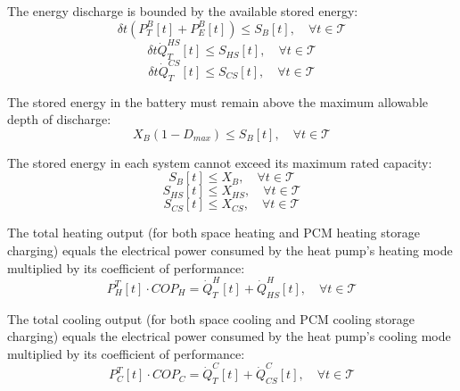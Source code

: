 \documentclass[11pt]{article}
\begin{document}
The energy discharge is bounded by the available stored energy:
\begin{equation}
\delta t (P^B_T[t] + P^B_E[t]) \leq S_B[t], \quad \forall t \in \mathcal{T}
\label{eq:batt_discharge}
\end{equation}
\begin{equation}
\delta t \dot{Q}^{HS}_T[t] \leq S_{HS}[t], \quad \forall t \in \mathcal{T}
\label{eq:pcmh_limit}
\end{equation}
\begin{equation}
\delta t \dot{Q}^{CS}_T[t] \leq S_{CS}[t], \quad \forall t \in \mathcal{T}
\label{eq:pcmc_limit}
\end{equation}

The stored energy in the battery must remain above the maximum allowable depth of discharge:
\begin{equation}
  X_B(1 - D_{max}) \leq S_B[t], \quad \forall t \in \mathcal{T} \label{eq:b_max_discharge}
\end{equation}

The stored energy in each system cannot exceed its maximum rated capacity:
\begin{equation}
S_B[t] \leq X_B, \quad \forall t \in \mathcal{T} \label{eq:batt_size}
\end{equation}
\begin{equation}
S_{HS}[t] \leq X_{HS}, \quad \forall t \in \mathcal{T} \label{eq:pcmh_size}
\end{equation}
\begin{equation}
S_{CS}[t] \leq X_{CS}, \quad \forall t \in \mathcal{T} \label{eq:pcmc_size}
\end{equation}

The total heating output (for both space heating and PCM heating storage charging) equals the electrical power consumed by the heat pump's heating mode multiplied by its coefficient of performance:
\begin{equation}
P^T_H[t] \cdot COP_H = \dot{Q}^H_T[t] + \dot{Q}^H_{HS}[t], \quad \forall t \in \mathcal{T}
\label{eq:hp_heating}
\end{equation}

The total cooling output (for both space cooling and PCM cooling storage charging) equals the electrical power consumed by the heat pump's cooling mode multiplied by its coefficient of performance:
\begin{equation}
P^T_C[t] \cdot COP_C = \dot{Q}^C_T[t] + \dot{Q}^C_{CS}[t], \quad \forall t \in \mathcal{T}
\label{eq:hp_cooling}
\end{equation}
\end{document}
